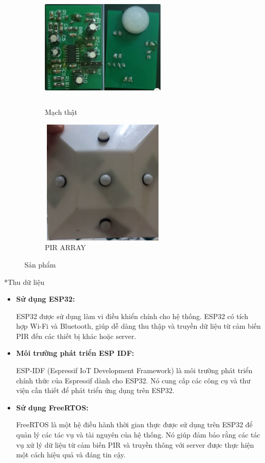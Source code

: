 \documentclass{article}
\begin{document}
\begin{figure}[H]
    \centering
    \begin{subfigure}[b]{0.45\textwidth}
        \centering
        \includegraphics[width=6cm,height=6cm]{image/anh10.png}
        \caption{Mạch thật} \label{EV1}
    \end{subfigure}
    \hfill
    \begin{subfigure}[b]{0.45\textwidth}
        \centering
        \includegraphics[width=6cm,height=6cm]{image/anh_pir.jpg}
        \caption{PIR ARRAY} \label{EV2}
    \end{subfigure}
    \caption{Sản phẩm}
    \label{fig:two_graphs}
\end{figure}
*Thu dữ liệu\\
\begin{itemize}
    \item[] \textbf{Sử dụng ESP32:}

    ESP32 được sử dụng làm vi điều khiển chính cho hệ thống. ESP32 có tích hợp Wi-Fi và Bluetooth, giúp dễ dàng thu thập và truyền dữ liệu từ cảm biến PIR đến các thiết bị khác hoặc server.
    
    \item[] \textbf{Môi trường phát triển ESP IDF:}

    ESP-IDF (Espressif IoT Development Framework) là môi trường phát triển chính thức của Espressif dành cho ESP32. Nó cung cấp các công cụ và thư viện cần thiết để phát triển ứng dụng trên ESP32.
    
    \item[] \textbf{Sử dụng FreeRTOS:}

    FreeRTOS là một hệ điều hành thời gian thực được sử dụng trên ESP32 để quản lý các tác vụ và tài nguyên của hệ thống. Nó giúp đảm bảo rằng các tác vụ xử lý dữ liệu từ cảm biến PIR và truyền thông với server được thực hiện một cách hiệu quả và đáng tin cậy.
\end{itemize}
\end{document}
